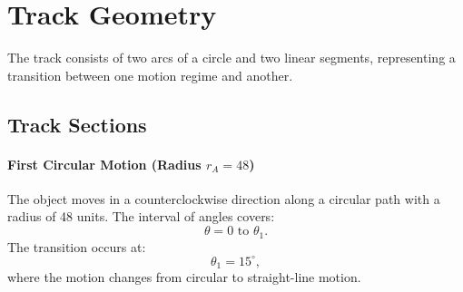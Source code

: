 \documentclass[a4paper,11pt]{article}
\begin{document}
%

\section*{Track Geometry}
The track consists of two arcs of a circle and two linear segments, representing a transition between one motion regime and another.

\subsection*{Track Sections}

\paragraph{First Circular Motion (Radius $r_A = 48$)}
The object moves in a counterclockwise direction along a circular path with a radius of 48 units. The interval of angles covers:
\begin{equation}
\theta = 0 \text{ to } \theta_1.
\end{equation}
The transition occurs at:
\begin{equation}
\theta_1 = 15^\circ,
\end{equation}
where the motion changes from circular to straight-line motion.
\end{document}
